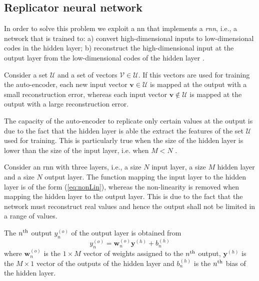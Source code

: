 \documentclass[draftcls,onecolumn,12pt]{IEEEtran}
\begin{document}
\subsection{Replicator neural network}
\label{sec:auto}

In order to solve this problem we exploit a \ac{nn} that implements a \textit{\ac{rnn}}, i.e., a network that is trained to: a) convert high-dimensional inputs to low-dimensional codes in the hidden layer; b) reconstruct the high-dimensional input at the output layer from the low-dimensional codes of the hidden layer \cite{Hinton-2006}.

Consider a set $\mathcal{U}$ and a set of vectors $\mathcal{V} \in \mathcal{U}$. If this vectors are used for training the auto-encoder, each new input vector $\bm{v} \in \mathcal{U}$ is mapped at the output with a small reconstruction error, whereas each input vector $\bm{v} \notin \mathcal{U} $ is mapped at the output with a large reconstruction error.

The capacity of the auto-encoder to replicate only certain values at the output is due to the fact that the hidden layer is able the extract the features of the set $\mathcal{U}$ used for training. This is particularly true when the size of the hidden layer is lower than the size of the input layer, i.e. when $M<N$ \cite{Bourlard-88}.

Consider an \ac{rnn} with three layers, i.e., a size $N$ input layer, a size $M$ hidden layer and a size $N$ output layer.  The function mapping the input layer to the hidden layer is of the form (\ref{eq:nonLin}), whereas the non-linearity is removed when mapping the hidden layer to the output layer. This is due to the fact that the network must reconstruct real values and hence the output shall not be limited in a range of values. 

The $n^{\rm th}$ output $y_n^{(o)}$ of the output layer is obtained from
\begin{equation}
    y_n^{(o)}= \bm{w}_n^{(o)}\bm{y}^{(h)}+b_n^{(h)}
\end{equation}
where $\bm{w}_n^{(o)}$ is the $1\times M$ vector of weights assigned to the $n^{\rm th}$ output, $\bm{y}^{(h)}$ is the $M\times 1$ vector of the outputs of the hidden layer and $b_n^{(h)}$ is the $n^{\rm th}$ bias of the hidden layer.
\end{document}

